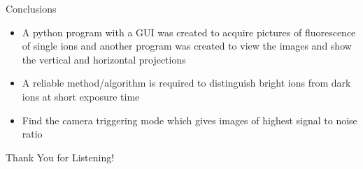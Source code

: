\documentclass{beamer}
\begin{document}
\begin{frame}{Conclusions}

\begin{itemize}
\item A python program with a GUI was created to acquire pictures of fluorescence of single ions and another program was created to view the images and show the vertical and horizontal projections
\bigskip
\item A reliable method/algorithm is required to distinguish bright ions from dark ions at short exposure time
\bigskip
\item Find the camera triggering mode which gives images of highest signal to noise ratio

\end{itemize}


\end{frame}

\begin{frame}[noframenumbering]

\centering
Thank You for Listening!



\end{frame}


\end{document}
